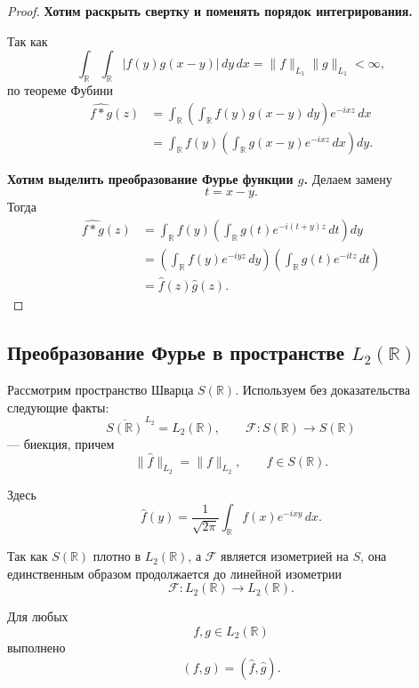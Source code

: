 \begin{proof}
	\textbf{Хотим раскрыть свертку и поменять порядок интегрирования.}
	
	Так как
	\[
	\int_{\mathbb R}\int_{\mathbb R}
	|f(y)g(x-y)|\,dy\,dx
	=
	\|f\|_{L_1}\|g\|_{L_1}
	<\infty,
	\]
	по теореме Фубини
	\[
	\begin{aligned}
		\widehat{f*g}(z)
		&=
		\int_{\mathbb R}
		\left(
		\int_{\mathbb R}f(y)g(x-y)\,dy
		\right)e^{-ixz}\,dx
		\\
		&=
		\int_{\mathbb R}f(y)
		\left(
		\int_{\mathbb R}g(x-y)e^{-ixz}\,dx
		\right)dy.
	\end{aligned}
	\]
	
	\textbf{Хотим выделить преобразование Фурье функции \(g\).}
	Делаем замену
	\[
	t=x-y.
	\]
	Тогда
	\[
	\begin{aligned}
		\widehat{f*g}(z)
		&=
		\int_{\mathbb R}f(y)
		\left(
		\int_{\mathbb R}g(t)e^{-i(t+y)z}\,dt
		\right)dy
		\\
		&=
		\left(
		\int_{\mathbb R}f(y)e^{-iyz}\,dy
		\right)
		\left(
		\int_{\mathbb R}g(t)e^{-itz}\,dt
		\right)
		\\
		&=
		\widehat f(z)\widehat g(z).
	\end{aligned}
	\]
\end{proof}

\subsection{Преобразование Фурье в пространстве \texorpdfstring{\(L_2(\mathbb R)\)}{L2(R)}}

Рассмотрим пространство Шварца \(S(\mathbb R)\).
Используем без доказательства следующие факты:
\[
\overline{S(\mathbb R)}^{\,L_2}=L_2(\mathbb R),
\qquad
\mathcal F:S(\mathbb R)\to S(\mathbb R)
\]
--- биекция, причем
\[
\|\widehat f\|_{L_2}=\|f\|_{L_2},
\qquad f\in S(\mathbb R).
\]

Здесь
\[
\widehat f(y)
=
\frac{1}{\sqrt{2\pi}}
\int_{\mathbb R}f(x)e^{-ixy}\,dx.
\]

Так как \(S(\mathbb R)\) плотно в \(L_2(\mathbb R)\),
а \(\mathcal F\) является изометрией на \(S\),
она единственным образом продолжается до линейной изометрии
\[
\mathcal F:L_2(\mathbb R)\to L_2(\mathbb R).
\]

\begin{theorem}
	Для любых
	\[
	f,g\in L_2(\mathbb R)
	\]
	выполнено
	\[
	(f,g)=(\widehat f,\widehat g).
	\]
\end{theorem}

